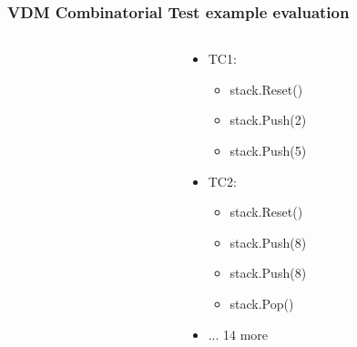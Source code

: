 %
%
\frame
{
  \frametitle{VDM Combinatorial Test example evaluation}
\begin{columns}
\begin{column}[l]{5cm}

	\begin{center}
	\end{center}

\end{column}
\begin{column}[r]{5cm}
	\begin{itemize}
		\item<2-> TC1:
		\begin{itemize}
			\item stack.Reset()
			\item stack.Push(2)
			\item stack.Push(5)
		\end{itemize}
		\item<3-> TC2:
		\begin{itemize}
			\item stack.Reset()
			\item stack.Push(8)
			\item stack.Push(8)
			\item stack.Pop()
		\end{itemize}
		\item<4-> ... 14 more
	\end{itemize}

\end{column}
\end{columns}
}


